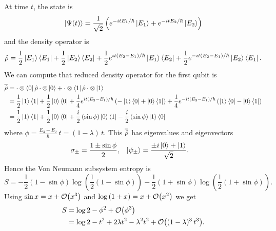 At time \(t\), the state is
\[
\left|\Psi(t)\right\rangle = \frac{1}{\sqrt{2}}\left(e^{-itE_1/\hbar}\left|E_1\right\rangle + e^{-itE_2/\hbar} \left|E_2\right\rangle\right)
\]
and the density operator is
\[
\hat{\rho} = \frac{1}{2}\left|E_1\right\rangle\left\langle E_1\right| + \frac{1}{2}\left|E_2\right\rangle\left\langle E_2\right| + \frac{1}{2} e^{it\left(E_2-E_1\right)/\hbar} \left|E_1\right\rangle\left\langle E_2\right| + \frac{1}{2} e^{-it\left(E_2 - E_1\right)/\hbar} \left|E_2\right\rangle\left\langle E_1\right|.
\]
We can compute that reduced density operator for the first qubit is
\begin{align*}
\overline{\hat{\rho}} &= \cdot\otimes\left\langle0\right| \hat{\rho} \cdot\otimes\left|0\right\rangle + \cdot\otimes\left\langle1\right| \hat{\rho} \cdot\otimes\left|1\right\rangle \\
&= \frac{1}{2} \left|1\right\rangle\left\langle1\right| + \frac{1}{2}\left|0\right\rangle\left\langle0\right| + \frac{1}{4} e^{it\left(E_2-E_1\right)/\hbar}\left(-\left|1\right\rangle\left\langle0\right| + \left|0\right\rangle\left\langle1\right|\right) + \frac{1}{4} e^{-it\left(E_2-E_1\right)/\hbar}\left(\left|1\right\rangle\left\langle0\right| - \left|0\right\rangle\left\langle1\right|\right) \\
&= \frac{1}{2}\left|1\right\rangle\left\langle1\right| + \frac{1}{2}\left|0\right\rangle\left\langle0\right| + \frac{i}{2} \left(\sin \phi\right) \left|0\right\rangle\left\langle1\right| - \frac{i}{2} \left(\sin \phi\right) \left|1\right\rangle\left\langle0\right|
\end{align*}
where \(\phi = \frac{E_3-E_2}{\hbar}\,t = (1-\lambda)\,t\).
This \(\overline{\hat{\rho}}\) has eigenvalues and eigenvectors
\begin{align*}
\sigma_{\pm} &= \frac{1 \pm \sin \phi}{2}, &
\left|\psi_\pm\right\rangle &= \frac{\pm i \left|0\right\rangle + \left|1\right\rangle}{\sqrt{2}}.
\end{align*}
Hence the Von Neumann subsystem entropy is
\[
S = - \frac{1}{2}\left(1-\sin\phi\right) \log \left(\frac{1}{2}\left(1-\sin\phi\right)\right) - \frac{1}{2}\left(1+\sin\phi\right) \log \left(\frac{1}{2}\left(1+\sin\phi\right)\right).
\]
Using \(\sin x = x + \mathcal{O}{\left(x^3\right)}\) and \(\log\left(1+x\right) = x + \mathcal{O}{\left(x^2\right)}\) we get
\begin{align*}
S &= \log 2 - \phi^2 + \mathcal{O}{\left(\phi^3\right)} \\
&= \log 2 - t^2 + 2 \lambda t^2 - \lambda^2 t^2 + \mathcal{O}{\left((1-\lambda)^3\,t^3\right)}.
\end{align*}

